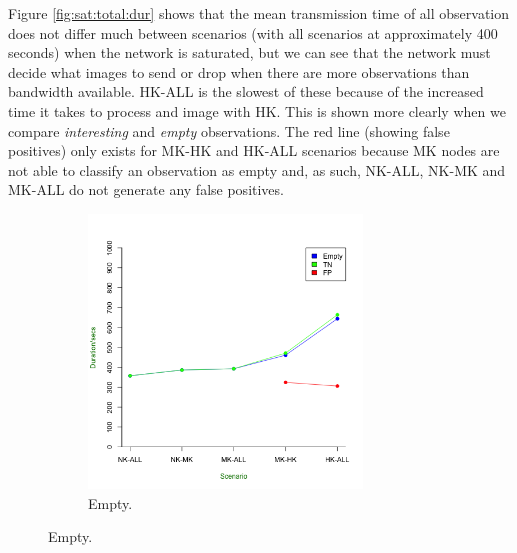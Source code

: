Figure \ref{fig:sat:total:dur} shows that the mean transmission time of all observation does not differ much between scenarios (with all scenarios at approximately 400 seconds) when the network is saturated, but we can see that the network must decide what images to send or drop when there are more observations than bandwidth available. HK-ALL is the slowest of these because of the increased time it takes to process and image with HK. This is shown more clearly when we compare \textit{interesting} and \textit{empty} observations. The red line (showing false positives) only exists for MK-HK and HK-ALL scenarios because MK nodes are not able to classify an observation as empty and, as such, NK-ALL, NK-MK and MK-ALL do not generate any false positives.

	\begin{figure}[ht!]
	\centering
		\begin{subfigure}{0.7\textwidth}
		\includegraphics[width=0.8\textwidth]{Chap7/figures/saturated/all_empty}
		\caption{Empty.}
		\label{fig:sat:empty:dur}
		\end{subfigure}


\end{figure}
